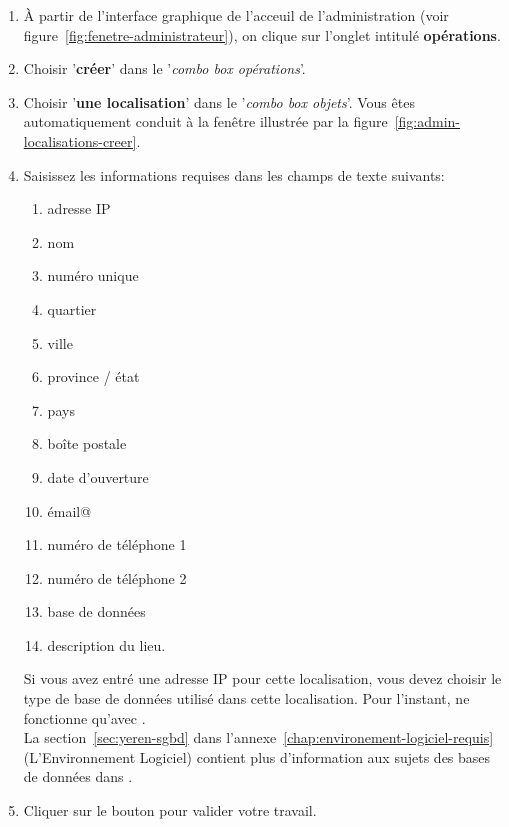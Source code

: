 \begin{enumerate}[1)]
	\item \`A partir de l'interface graphique de l'acceuil de
		l'administration (voir figure~\ref{fig:fenetre-administrateur}),
		on clique sur l'onglet intitul\'e \textbf{op\'erations}. 
		
	\item Choisir '\textbf{cr\'eer}' dans le '\emph{combo box
		op\'erations}'.
		
	\item Choisir '\textbf{une localisation}' dans
		le '\emph{combo box objets}'. Vous \^etes automatiquement
		conduit \`a la fen\^etre illustr\'ee par la
		figure~\ref{fig:admin-localisations-creer}.
		
	\item Saisissez les informations requises dans les champs
		de texte suivants:
		\begin{enumerate}[1)]
			\item adresse IP 
			\item nom \obligatoire
			\item num\'ero unique 
			\item quartier
			\item ville
			\item province / \'etat
			\item pays
			\item bo\^ite postale
			\item date d'ouverture
			\item \'email@
			\item num\'ero de t\'el\'ephone 1
			\item num\'ero de t\'el\'ephone 2	
			\item base de donn\'ees					
			\item description du lieu.\\
		\end{enumerate}
		
		Si vous avez entr\'e une adresse IP pour cette 
		localisation, vous devez choisir le type de base de
		donn\'ees utilis\'e dans cette localisation. Pour
		l'instant, \yeroth ne fonctionne qu'avec .\\
		
		La section~\ref{sec:yeren-sgbd} dans
		l'annexe~\ref{chap:environement-logiciel-requis}
		(L'Environnement Logiciel) contient plus d'information
		aux sujets des bases de donn\'ees dans \yeroth.
		
	\item Cliquer sur le bouton  pour
		valider votre travail.	
\end{enumerate}


